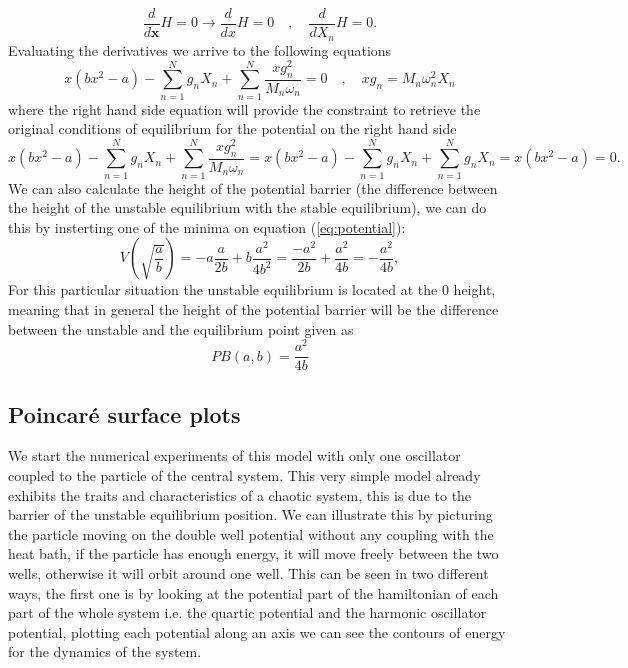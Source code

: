 \begin{equation}
\frac{d}{d\textbf{x}}H=0\rightarrow \frac{d}{dx}H =0 \quad , \quad \frac{d}{dX_n}H  = 0.
\end{equation}
Evaluating the derivatives we arrive to the following equations
\begin{equation}
x(bx^2-a)-\sum_{n=1}^N g_n X_n +\sum_{n=1}^N \frac{xg_n^2}{M_n\omega_n}=0 \quad , \quad xg_n=M_n\omega_n^2 X_n 
\end{equation}
where the right hand side equation will provide the constraint to retrieve the original conditions of equilibrium for the potential on the right hand side
\begin{equation}
x(bx^2-a)-\sum_{n=1}^N g_n X_n +\sum_{n=1}^N \frac{xg_n^2}{M_n\omega_n}= x(bx^2-a)-\sum_{n=1}^N g_n X_n +\sum_{n=1}^N g_n X_n=x(bx^2-a)=0.
\end{equation}
We can also calculate the height of the potential barrier (the difference between the height of the unstable equilibrium with the stable equilibrium), we can do this by insterting one of the minima on equation (\ref{eq:potential}):
\begin{equation}
V(\sqrt{\frac{a}{b}})=-a\frac{a}{2b}+b\frac{a^2}{4b^2}=\frac{-a^2}{2b}+\frac{a^2}{4b}=-\frac{a^2}{4b},
\end{equation}
For this particular situation the unstable equilibrium is located at the $0$ height, meaning that in general the height of the potential barrier will be the difference between the unstable and the equilibrium point given as
\begin{equation}
PB(a,b)=\frac{a^2}{4b}
\label{eq:PB_eq}
\end{equation}






\subsection{Poincaré surface plots}
We start the numerical experiments of this model with only one oscillator coupled to the particle of the central system. This very simple model already exhibits the traits and characteristics of a chaotic system, this is due to the barrier of the unstable equilibrium position. We can illustrate this by picturing the particle moving on the double well potential without any coupling with the heat bath, if the particle has enough energy, it will move freely between the two wells, otherwise it will orbit around one well. This can be seen in two different ways, the first one is by looking at the potential part of the hamiltonian of each part of the whole system i.e. the quartic potential and the harmonic oscillator potential, plotting each potential along an axis we can see the contours of energy for the dynamics of the system.

